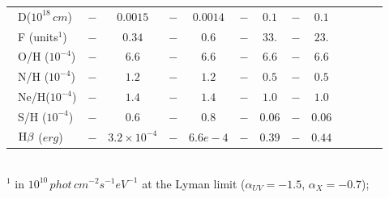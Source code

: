 \documentclass[../thesis.tex]{subfiles}
\begin{document}
\begin{landscape}
\begin{table}
{\begin{tabular}{lcccccccccccc}
\ D($10^{18}\,\si{cm}$)      &$-     $&$0.0015$&$-      $&$0.0014$&$-    $&$0.1   $&$-     $&$0.1   $\\
\ F (units$^1$)       &$-     $&$0.34  $&$-      $&$ 0.6  $&$-    $&$33.   $&$-     $&$23.   $ \\
\ O/H ($10^{-4}$)     &$-     $&$6.6   $&$-      $&$ 6.6  $&$-    $&$6.6   $&$-     $&$6.6   $\\
\ N/H ($10^{-4}$)     &$-     $&$1.2   $&$-      $&$ 1.2  $&$-    $&$0.5   $&$-     $&$0.5   $\\
\ Ne/H($10^{-4}$)     &$-     $&$1.4   $&$-      $&$ 1.4  $&$-    $&$1.0   $&$-     $&$1.0   $ \\
\ S/H ($10^{-4}$)     &$-     $&$0.6   $&$-      $&$ 0.8  $&$-    $&$0.06  $&$-     $&$0.06  $\\
\ $\rm H\beta$ ($\si{erg}$)          &$-     $&$3.2\times10^{-4}$&$-      $&$6.6e-4$&$-    $&$0.39  $&$-     $&$0.44  $\\
 \hline

\end{tabular}}
\\
$^1$ in $10^{10}\,\si{phot\,cm^{-2} s^{-1} eV^{-1}}$ at the Lyman limit
(${\alpha}_{UV}=-1.5$, ${\alpha}_X=-0.7$);
\end{table}
\end{landscape}
\end{document}
